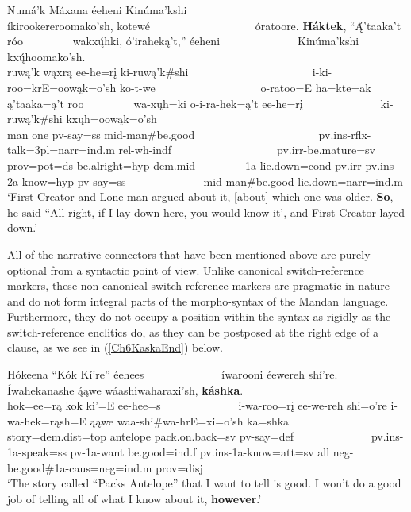 \begin{exe}
\begin{xlist}
        \item\label{Ch6ExHaktekB} \glll Numá'k Máxana éeheni Kinúma'kshi ~ ~ ~ ~ ~ ~ ~ ~ ~ ~ ~ ~ ~  íkirookereroomako'sh, kotewé ~ ~ ~ ~ ~ ~ ~ ~ ~ ~ ~ óratoore. \textbf{Háktek}, ``Ą́'taaka't róo ~ ~ ~ ~ ~ wakxų́hki, ó'iraheką't,'' éeheni ~ ~ ~ ~ ~ ~ ~ ~ Kinúma'kshi kxų́hoomako'sh.\\
        ruwą'k wąxrą ee-he=rį ki-ruwą'k\#shi ~ ~ ~ ~ ~ ~ ~ ~ ~ ~ ~ ~ ~ i-ki-roo=krE=oowąk=o'sh ko-t-we ~ ~ ~ ~ ~ ~ ~ ~ ~ ~ ~ o-ratoo=E ha=kte=ak ą'taaka=ą't roo ~ ~ ~ ~ ~ wa-xųh=ki o-i-ra-hek=ą't ee-he=rį ~ ~ ~ ~ ~ ~ ~ ~ ki-ruwą'k\#shi kxųh=oowąk=o'sh\\
        \textnormal{man} \textnormal{one} pv-\textnormal{say}=ss mid-\textnormal{man}\#\textnormal{be.good} ~ ~ ~ ~ ~ ~ ~ ~ ~ ~ ~ ~ ~ pv.ins-rflx-\textnormal{talk}=3pl=narr=ind.m rel-wh-indf ~ ~ ~ ~ ~ ~ ~ ~ ~ ~ ~ pv.irr-\textnormal{be.mature}=sv prov=pot=ds \textnormal{be.alright}=hyp dem.mid ~ ~ ~ ~ ~ 1a-\textnormal{lie.down}=cond pv.irr-pv.ins-2a-\textnormal{know}=hyp pv-\textnormal{say}=ss ~ ~ ~ ~ ~ ~ ~ ~ mid-\textnormal{man}\#\textnormal{be.good} \textnormal{lie.down}=narr=ind.m\\
        \glt `First Creator and Lone man argued about it, [about] which one was older. \textbf{So}, he said ``All right, if I lay down here, you would know it', and First Creator layed down.' \citep[1]{hollow1973a}
    \end{xlist}
\end{exe}

All of the narrative connectors that have been mentioned above are purely optional from a syntactic point of view. Unlike canonical switch-reference markers, these non-canonical switch-reference markers are pragmatic in nature and do not form integral parts of the morpho-syntax of the Mandan language. Furthermore, they do not occupy a position within the syntax as rigidly as the switch-reference enclitics do, as they can be postposed at the right edge of a clause, as we see in (\ref{Ch6KaskaEnd}) below.

\begin{exe}
    \item\label{Ch6KaskaEnd} \glll Hókeena ``Kók Kí're'' éehees ~ ~ ~ ~ ~ ~ ~ ~ íwarooni éewereh shí're. Íwahekanashe ą́ąwe wáashiwaharaxi'sh, \textbf{káshka}.\\
    hok=ee=rą kok ki'=E ee-hee=s ~ ~ ~ ~ ~ ~ ~ ~ i-wa-roo=rį ee-we-reh shi=o're i-wa-hek=rąsh=E ąąwe waa-shi\#wa-hrE=xi=o'sh ka=shka\\
    \textnormal{story}=dem.dist=top \textnormal{antelope} \textnormal{pack.on.back}=sv pv-\textnormal{say}=def ~ ~ ~ ~ ~ ~ ~ ~ pv.ins-1a-\textnormal{speak}=ss pv-1a-\textnormal{want} \textnormal{be.good}=ind.f pv.ins-1a-\textnormal{know}=att=sv \textnormal{all} neg-\textnormal{be.good}\#1a-caus=neg=ind.m prov=disj\\
    \glt `The story called ``Packs Antelope'' that I want to tell is good. I won't do a good job of telling all of what I know about it, \textbf{however}.' \citep[210]{hollow1973a}
\end{exe}


